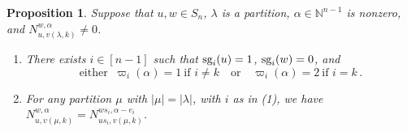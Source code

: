 \documentclass[12pt,oneside,reqno]{amsart}
\newtheorem{proposition}[theorem]{Proposition}
\theoremstyle{definition}
\numberwithin{equation}{section}
\newcommand{\NN}{{\mathbb N}}
\newcommand{\sg}{{\mbox{\rm sg}}}
\begin{document}
\begin{proposition}\label{P:LLThm1.2}
  Suppose that $u,w\in S_n$, $\lambda$ is a partition, $\alpha\in\NN^{n-1}$ is nonzero, and $N^{w,\alpha}_{u,v(\lambda,k)}\neq 0$.
  \begin{enumerate}
  \item There exists $i\in[n{-}1]$ such that $\sg_i(u)=1$, $\sg_i(w)=0$, and
  \[
    \mbox{either }\ \varpi_i(\alpha) = 1\ \mbox{if }i\neq k
    \quad\mbox{or}\quad
    \varpi_i(\alpha) = 2\ \mbox{if }i= k    \,.
  \]

   \item For any partition $\mu$ with $|\mu|=|\lambda|$, with $i$ as in (1), we have
        $ N^{w,\alpha}_{u,v(\mu,k)}=N^{ws_i, \alpha-e_i}_{us_i,v(\mu,k)}$.
   \end{enumerate}
 \end{proposition}
\end{document}
